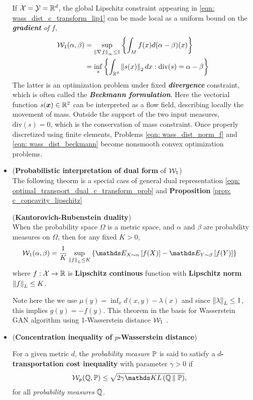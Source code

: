 \documentclass[11pt]{article}
\begin{document}
\begin{itemize}
If ${\mathcal X} = {\mathcal Y} = {\mathbb R}^{d}$,  the global Lipschitz constraint appearing in \eqref{eqn: wass_dist_c_transform_lip1} can be made local as a uniform bound on the \emph{\textbf{gradient} of} $f$,
\begin{align}
{\mathcal W}_{1}(\alpha, \beta) &= \sup_{\left\|\nabla_{}{f}\right\|_{\infty} \le 1}\left\{\int_{M} f(x) d(\alpha - \beta)(x) \right\}  \label{eqn: wass_dist_norm_f} \\
&= \inf_{s}\left\{\int_{{\mathbb R}^{d}} \left\|s(x)\right\|_{2}dx:  \text{div}(s) = \alpha - \beta \right\}  \label{eqn: wass_dist_beckmann}
\end{align} The latter is  an optimization problem under fixed \emph{\textbf{divergence}} constraint, which is often called the \textbf{\emph{Beckmann formulation}}. Here the vectorial function $s(\boldsymbol{x}) \in {\mathbb R}^2$ can be interpreted as a flow field, describing locally the movement of mass. Outside the support of the two input measures,  $\text{div}(s) = 0$, which is the conservation of mass constraint. Once properly discretized using finite elements, Problems \eqref{eqn: wass_dist_norm_f} and \eqref{eqn: wass_dist_beckmann} become nonsmooth convex optimization problems. 



\item (\textbf{Probabilistic interpretation of dual form} of ${\mathcal W}_1$)\\
The following theorm is a special caes of general dual representation \eqref{eqn: optimal_transport_dual_c_transform_prob}  and \textbf{Proposition} \ref{prop: c_concavity_lipschitz}
\begin{theorem} (\textbf{Kantorovich-Rubenstein duality})\\
When the probability space $\Omega$ is a metric space, and $\alpha$ and $\beta$ are probability measures on $\Omega$,  then for any fixed $K>0$,
\begin{align}
\cW_{1}(\alpha, \beta) &= \frac{1}{K}\sup_{\norm{f}{L} \le K}\set{\E{X\sim \alpha}{f(X)} - \E{Y \sim \beta}{f(Y)}} \label{eqn: wass_dist_l1_general_dual_prob}
\end{align} where $f: {\mathcal X} \rightarrow {\mathbb R}$ is \textbf{Lipschitz continous} function with  \textbf{Lipschitz norm} $\left\|f\right\|_{L} \le K$.
\end{theorem}
Note here the we use $\mu(y)=\inf_{x}d(x,y) - \lambda(x)$ and since $\left\|\lambda\right\|_{L} \le 1$, this implies $g(y)= - f(y)$. This theorem in the basis for Wasserstein GAN algorithm using 1-Wasserstein distance ${\mathcal W}_1$ \citep{arjovsky2017wasserstein}.

\item (\textbf{Concentration inequality of $p$-Wasserstein distance}) \\
\begin{definition}\citep{wainwright2019high} For a given metric $d$, the \emph{probability measure} ${\mathbb P}$ is said to satisfy a \textbf{$d$-transportation cost inequality} with parameter $\gamma > 0$ if
\begin{align}
\cW_{p}(\bQ, \bP) &\le \sqrt{2 \gamma \kl{\bQ}{\bP}},  \label{eqn: wasserstein_inequality}
\end{align}  for all \emph{probability measures} ${\mathbb Q}$.
\end{definition}


\end{itemize}
\end{document}
